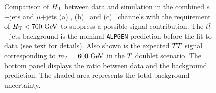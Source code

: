 \begin{figure}[h!tb]\begin{center}
	\caption{Comparison of $\HT$ between data and simulation in the combined
$e$+jets and $\mu$+jets (a) \chii, (b) \chiii\ and (c) \chiv\ channels with 
the requirement of $\HT<700\gev$ to suppress a possible signal contribution.
The $t\bar{t}$+jets background is the nominal \texttt{ALPGEN} prediction before the fit to data (see text for details).
Also shown is the expected $\TT$ signal corresponding to $m_{\T}=600\gev$ in the $\T$ doublet scenario.
The bottom panel displays the ratio between data
and the background prediction. The shaded area represents the total background uncertainty.\label{fig:HT_beforefit}}
\end{center}\end{figure}
